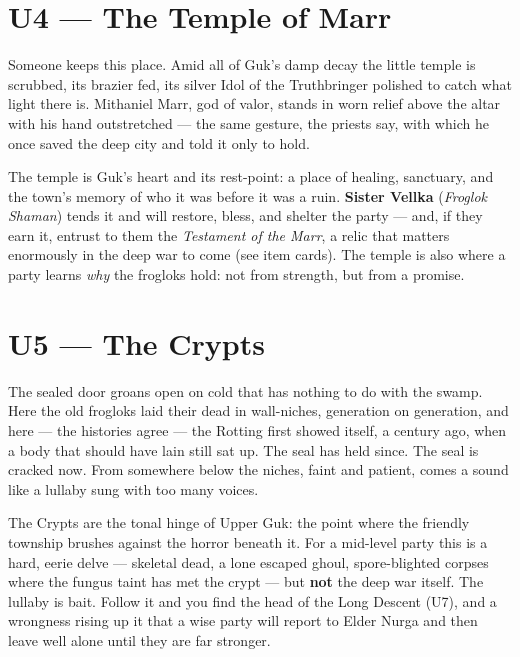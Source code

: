 \documentclass[10pt,twoside]{report}
\begin{document}
\section{U4 --- The Temple of Marr}
\begin{readaloud}
Someone keeps this place. Amid all of Guk's damp decay the little temple is scrubbed, its brazier fed, its silver Idol of the Truthbringer polished to catch what light there is. Mithaniel Marr, god of valor, stands in worn relief above the altar with his hand outstretched --- the same gesture, the priests say, with which he once saved the deep city and told it only to hold.
\end{readaloud}
The temple is Guk's heart and its rest-point: a place of healing, sanctuary, and the town's memory of who it was before it was a ruin. \textbf{Sister Vellka} (\emph{Froglok Shaman}) tends it and will restore, bless, and shelter the party --- and, if they earn it, entrust to them the \emph{Testament of the Marr}, a relic that matters enormously in the deep war to come (see item cards). The temple is also where a party learns \emph{why} the frogloks hold: not from strength, but from a promise.

\section{U5 --- The Crypts}
\begin{readaloud}
The sealed door groans open on cold that has nothing to do with the swamp. Here the old frogloks laid their dead in wall-niches, generation on generation, and here --- the histories agree --- the Rotting first showed itself, a century ago, when a body that should have lain still sat up. The seal has held since. The seal is cracked now. From somewhere below the niches, faint and patient, comes a sound like a lullaby sung with too many voices.
\end{readaloud}
The Crypts are the tonal hinge of Upper Guk: the point where the friendly township brushes against the horror beneath it. For a mid-level party this is a hard, eerie delve --- skeletal dead, a lone escaped ghoul, spore-blighted corpses where the fungus taint has met the crypt --- but \textbf{not} the deep war itself. The lullaby is bait. Follow it and you find the head of the Long Descent (U7), and a wrongness rising up it that a wise party will report to Elder Nurga and then leave well alone until they are far stronger.
\end{document}
